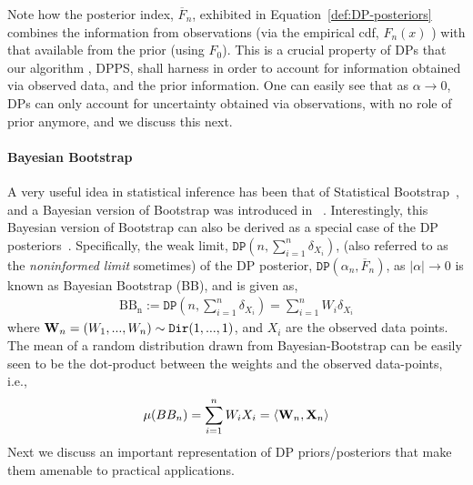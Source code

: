 \documentclass[10pt]{article}
\newcommand{\Dir}{\texttt{Dir}}
\newcommand{\DP}{\texttt{DP}}
\begin{document}
Note how the posterior index, $\overline{F}_n$,  exhibited in Equation~\ref{def:DP-posteriors} combines the information from observations (via the empirical cdf, $F_{n}(x)$ ) with that available from the prior (using $F_{0}$). This is a crucial property of DPs that our algorithm , DPPS, shall harness in order to account for information obtained via  observed data, and the prior information.  One can easily see that as $\alpha \to 0$, DPs can only account for uncertainty obtained via observations, with no role of prior anymore, and we discuss this next. 
\paragraph{Bayesian Bootstrap}  A very useful idea in statistical inference has been that of Statistical Bootstrap~\citep{efron1994introduction}, and a Bayesian version of Bootstrap was introduced in ~\citep{rubin1981bayesian}. Interestingly, this Bayesian version of Bootstrap can also be derived as a special case of the DP posteriors~\citep{ghosal2017fundamentals}. Specifically, the weak limit, $\DP(n,\sum_{i=1}^{n}\delta_{X_{i}})$, (also referred to as the \textit{noninformed limit} sometimes) of the DP posterior, $\DP(\alpha_{n},\overline{F}_n)$, as $|\alpha|\to 0$ is known as Bayesian Bootstrap (BB), and is given as,
\begin{align}\label{def:Bayesian-Bootstrap}
\mathrm{BB_{n}}:= \DP(n,\sum_{i=1}^{n}\delta_{X_{i}}) = \sum_{i=1}^{n} W_{i}\delta_{X_{i}}
\end{align}
where ${\bf W}_n=(W_{1},...,W_{n}) \sim \Dir (1,...,1)$, and $X_{i}$ are the observed data points. The mean of a random distribution drawn from Bayesian-Bootstrap can be easily seen to be the dot-product between the weights and the observed data-points, i.e.,
\begin{align}\label{def: BB-mean}
\mu(BB_{n}) = \sum_{i=1}^{n}W_{i}X_{i} = \left<{\bf W}_n,{\bf X}_n\right>
\end{align}
Next we discuss an important representation of DP priors/posteriors that make them amenable to practical applications.
\end{document}
